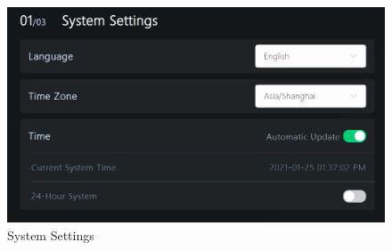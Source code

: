 \begin{figure}[ht]
    \centering
    \includegraphics[width=\textwidth]{en/image/2-5.png}
    \caption{System Settings}
    \label{fig:系统设置}
\end{figure}

